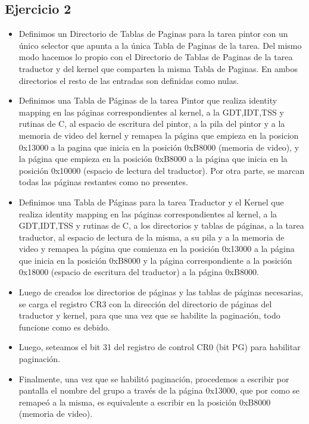 
\subsection{Ejercicio 2}
\begin{itemize}
 \item Definimos un Directorio de Tablas de Paginas para la tarea pintor con un \'unico selector que apunta a la \'unica Tabla de Paginas de la tarea. Del mismo modo hacemos lo propio con el Directorio de Tablas de Paginas de la tarea traductor y del kernel que comparten la misma Tabla de Paginas. En ambos directorios el resto de las entradas son definidas como nulas.
 \item Definimos una Tabla de P\'aginas de la tarea Pintor que realiza identity mapping en las p\'aginas correspondientes al kernel, a la GDT,IDT,TSS y rutinas de C, al espacio de escritura del pintor, a la pila del pintor y a la memoria de video del kernel y remapea la p\'agina que empieza en la posicion 0x13000 a la pagina que inicia en la posici\'on 0xB8000 (memoria de video), y la p\'agina que empieza en la posici\'on 0xB8000 a la p\'agina que inicia en la posici\'on 0x10000 (espacio de lectura del traductor). Por otra parte, se marcan todas las p\'aginas restantes como no presentes.
 \item Definimos una Tabla de P\'aginas para la tarea Traductor y el Kernel que realiza identity mapping en las p\'aginas correspondientes al kernel, a la GDT,IDT,TSS y rutinas de C, a los directorios y tablas de p\'aginas, a la tarea traductor, al espacio de lectura de la misma, a su pila y a la memoria de video y remapea la p\'agina que comienza en la posici\'on 0x13000 a la p\'agina que inicia en la posici\'on 0xB8000 y la p\'agina correspondiente a la posici\'on 0x18000 (espacio de escritura del traductor) a la p\'agina 0xB8000.
 \item Luego de creados los directorios de p\'aginas y las tablas de p\'aginas necesarias, se carga el registro CR3 con la direcci\'on del directorio de p\'aginas del traductor y kernel, para que una vez que se habilite la paginaci\'on, todo funcione como es debido.
 \item Luego, seteamos el bit 31 del registro de control CR0 (bit PG) para habilitar paginaci\'on.
 \item Finalmente, una vez que se habilit\'o paginaci\'on, procedemos a escribir por pantalla el nombre del grupo a trav\'es de la p\'agina 0x13000, que por como se remape\'o a la misma, es equivalente a escribir en la posici\'on 0xB8000 (memoria de video).
\end{itemize}

